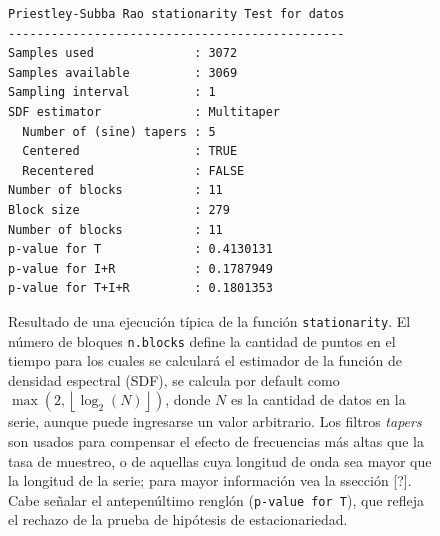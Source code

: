 \begin{figure}
\centering
\begin{lstlisting}
Priestley-Subba Rao stationarity Test for datos
-----------------------------------------------
Samples used              : 3072 
Samples available         : 3069 
Sampling interval         : 1 
SDF estimator             : Multitaper 
  Number of (sine) tapers : 5 
  Centered                : TRUE 
  Recentered              : FALSE 
Number of blocks          : 11 
Block size                : 279 
Number of blocks          : 11 
p-value for T             : 0.4130131 
p-value for I+R           : 0.1787949 
p-value for T+I+R         : 0.1801353 
\end{lstlisting}
\caption{Resultado de una ejecuci\'on t\'ipica de la funci\'on \texttt{stationarity}. 
El n\'umero de bloques \texttt{n.blocks} define la cantidad de puntos en el tiempo
para los cuales se calcular\'a el estimador de la funci\'on de densidad espectral (SDF),
se calcula por default como
$\max \left( 2 , \left\lfloor \log_2\left( N \right) \right\rfloor \right)$, donde
$N$ es la cantidad de datos en la serie, aunque puede ingresarse un valor arbitrario.
Los filtros \textit{tapers} son usados para compensar el efecto de frecuencias m\'as altas que la 
tasa de muestreo, o de aquellas cuya longitud de onda sea mayor que la longitud de la serie;
para mayor informaci\'on vea la ssecci\'on [?].
Cabe se\~nalar el antepen\'ultimo rengl\'on (\texttt{p-value for T}), que refleja el rechazo de 
la prueba de 
hip\'otesis de estacionariedad.}
\label{res_psr}
\end{figure}




